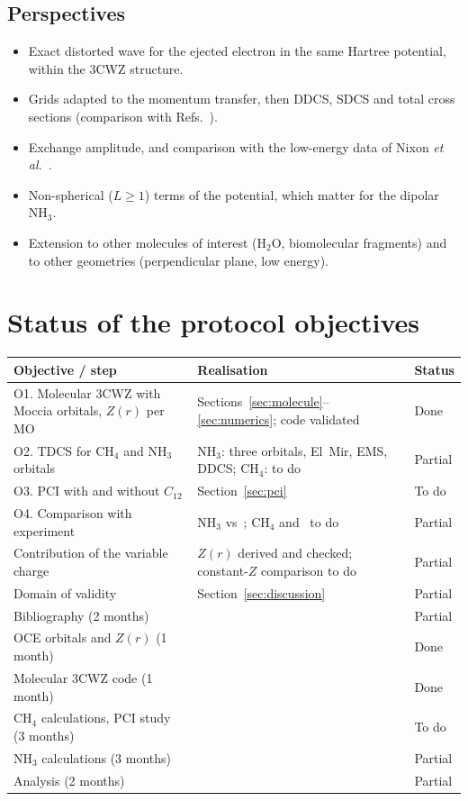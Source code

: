\documentclass[11pt,a4paper]{article}
\newcommand{\NH}{NH$_3$}
\newcommand{\CH}{CH$_4$}
\begin{document}
\subsection{Perspectives}
\begin{itemize}
\item Exact distorted wave for the ejected electron in the same Hartree potential, within the 3CWZ
  structure.
\item Grids adapted to the momentum transfer, then DDCS, SDCS and total cross sections
  (comparison with Refs.~\cite{Opal1972,Rejoub2001}).
\item Exchange amplitude, and comparison with the low-energy data of Nixon
  \emph{et al.}~\cite{Nixon2013}.
\item Non-spherical ($L\ge1$) terms of the potential, which matter for the dipolar \NH.
\item Extension to other molecules of interest (H$_2$O, biomolecular fragments) and to other
  geometries (perpendicular plane, low energy).
\end{itemize}

\appendix
\section{Status of the protocol objectives}
\begin{table}[H]\centering\small
\begin{tabular}{p{4.2cm}p{7.6cm}p{2.2cm}}\toprule
Objective / step & Realisation & Status\\\midrule
O1. Molecular 3CWZ with Moccia orbitals, $Z(r)$ per MO & Sections~\ref{sec:molecule}--\ref{sec:numerics}; code validated & Done\\
O2. TDCS for \CH{} and \NH{} orbitals & \NH: three orbitals, El~Mir, EMS, DDCS; \CH: to do & Partial\\
O3. PCI with and without $C_{12}$ & Section~\ref{sec:pci} & To do\\
O4. Comparison with experiment & \NH{} vs~\cite{ElMir2020,Bawagan1988,Opal1972}; \CH{} and~\cite{Nixon2013,Rejoub2001} to do & Partial\\
Contribution of the variable charge & $Z(r)$ derived and checked; constant-$Z$ comparison to do & Partial\\
Domain of validity & Section~\ref{sec:discussion} & Partial\\\midrule
Bibliography (2 months) & & Partial\\
OCE orbitals and $Z(r)$ (1 month) & & Done\\
Molecular 3CWZ code (1 month) & & Done\\
\CH{} calculations, PCI study (3 months) & & To do\\
\NH{} calculations (3 months) & & Partial\\
Analysis (2 months) & & Partial\\\bottomrule
\end{tabular}
\end{table}
\end{document}
